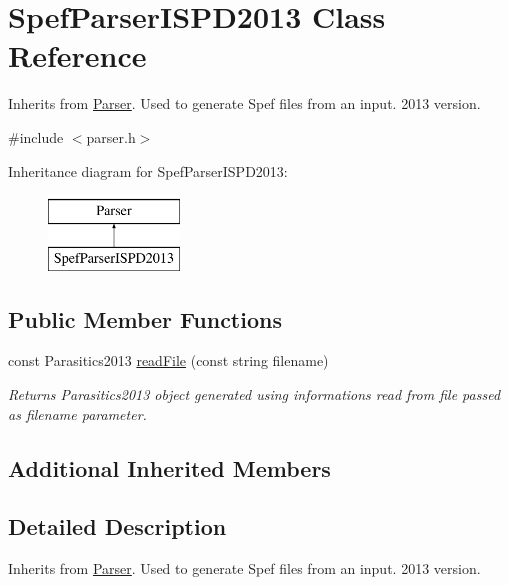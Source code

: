 \hypertarget{classSpefParserISPD2013}{\section{Spef\-Parser\-I\-S\-P\-D2013 Class Reference}
\label{classSpefParserISPD2013}
}


Inherits from \hyperlink{classParser}{Parser}. Used to generate Spef files from an input. 2013 version.  




{\ttfamily \#include $<$parser.\-h$>$}

Inheritance diagram for Spef\-Parser\-I\-S\-P\-D2013\-:\begin{figure}[H]
\begin{center}
\leavevmode
\includegraphics[height=2.000000cm]{classSpefParserISPD2013}
\end{center}
\end{figure}
\subsection*{Public Member Functions}
\begin{DoxyCompactItemize}
\item 
const Parasitics2013 \hyperlink{classSpefParserISPD2013_a11c71d121883895a367a99b052aada73}{read\-File} (const string filename)
\begin{DoxyCompactList}\small\item\em Returns Parasitics2013 object generated using informations read from file passed as filename parameter. \end{DoxyCompactList}\end{DoxyCompactItemize}
\subsection*{Additional Inherited Members}


\subsection{Detailed Description}
Inherits from \hyperlink{classParser}{Parser}. Used to generate Spef files from an input. 2013 version. 

